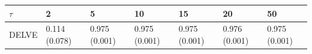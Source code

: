 \begin{tabular}{lllllll}
\toprule
$\tau$ & 2 & 5 & 10 & 15 & 20 & 50 \\
\midrule
DELVE & 0.114 (0.078) & 0.975 (0.001) & 0.975 (0.001) & 0.975 (0.001) & 0.976 (0.001) & 0.975 (0.001) \\
\bottomrule
\end{tabular}
